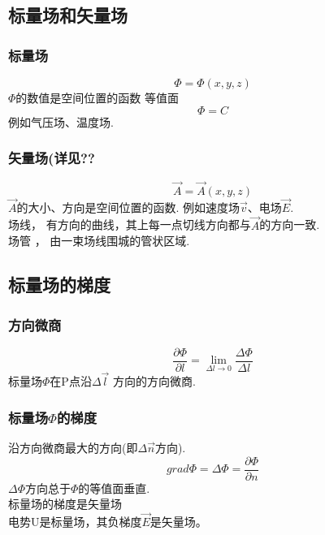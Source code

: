 
\subsection{标量场和矢量场}
\subsubsection{标量场}
\begin{equation}\label{VecAnl_eq1}
\Phi=\Phi(x,y,z)
\end{equation}
 $\Phi$的数值是空间位置的函数
 等值面
\begin{equation}\label{VecAnl_eq2}
\Phi=C
\end{equation}
 例如气压场、温度场.
\subsubsection{矢量场(详见??}%
\begin{equation}\label{VecAnl_eq3}
\vec {A}= \vec{A}(x,y,z)
\end{equation}
$\vec{A}$的大小、方向是空间位置的函数.
例如速度场$\vec{v}$、电场$\vec{E}$.\\
\qquad 场线，
 有方向的曲线，其上每一点切线方向都与$\vec{A}$的方向一致.\\
\qquad 场管 ，
由一束场线围城的管状区域.

\subsection{标量场的梯度}%
\subsubsection{方向微商}
\begin{equation}\label{VecAnl_eq4}
\frac{\partial \Phi}{\partial l}=\lim_{\Delta l \to 0}\frac{\Delta \Phi}{\Delta l}
\end{equation}
标量场$\Phi$在P点沿$\Delta \vec{l} $ 方向的方向微商.

\subsubsection{标量场$\Phi$的梯度}
沿方向微商最大的方向(即$\Delta \vec{n}$方向).
\begin{equation}\label{VecAnl_eq5}
grad \Phi = \Delta \Phi =\frac{\partial \Phi}{\partial n}
\end{equation}
$\Delta \Phi$方向总于$\Phi$的等值面垂直.\\
标量场的梯度是矢量场\\
电势U是标量场，其负梯度$\vec{E}$是矢量场。

